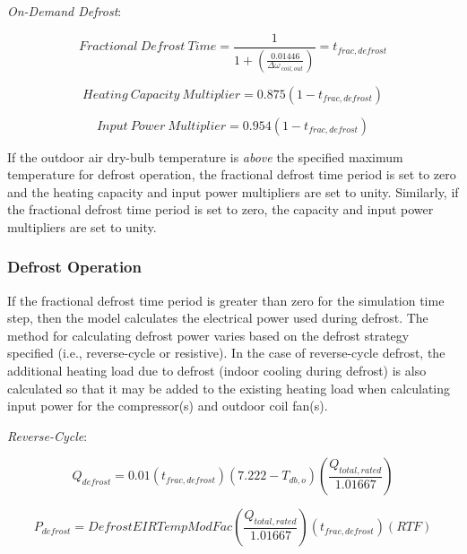 \emph{On-Demand Defrost}:

\begin{equation}
Fractional~Defrost~Time = \frac{1}{{1 + \left( {\frac{{0.01446}}{{\Delta {\omega_{\,coil,out}}}}} \right)}} = {t_{frac,defrost}}
\end{equation}

\begin{equation}
Heating~Capacity~Multiplier = 0.875\left( {1 - {t_{frac,defrost}}} \right)
\label{eq:SSEHPDXHeatingCapacityMultiplierOnDemandDefrost}
\end{equation}

\begin{equation}
Input~Power~Multiplier = 0.954\left( {1 - {t_{frac,defrost}}} \right)
\label{eq:SSEHPDXInputPowerMultiplierOnDemandDefrost}
\end{equation}

If the outdoor air dry-bulb temperature is \emph{above} the specified maximum temperature for defrost operation, the fractional defrost time period is set to zero and the heating capacity and input power multipliers are set to unity. Similarly, if the fractional defrost time period is set to zero, the capacity and input power multipliers are set to unity.

\subsubsection{Defrost Operation}\label{defrost-operation}

If the fractional defrost time period is greater than zero for the simulation time step, then the model calculates the electrical power used during defrost. The method for calculating defrost power varies based on the defrost strategy specified (i.e., reverse-cycle or resistive). In the case of reverse-cycle defrost, the additional heating load due to defrost (indoor cooling during defrost) is also calculated so that it may be added to the existing heating load when calculating input power for the compressor(s) and outdoor coil fan(s).

\emph{Reverse-Cycle}:

\begin{equation}
{Q_{defrost}} = 0.01\left( {{t_{frac,defrost}}} \right)\left( {7.222 - {T_{db,o}}} \right)\left( {\frac{{{Q_{total,rated}}}}{{1.01667}}} \right)
\end{equation}

\begin{equation}
{P_{defrost}} = DefrostEIRTempModFac\left( {\frac{{{Q_{total,rated}}}}{{1.01667}}} \right)\left( {{t_{frac,defrost}}} \right)\left( {RTF} \right)
\end{equation}

